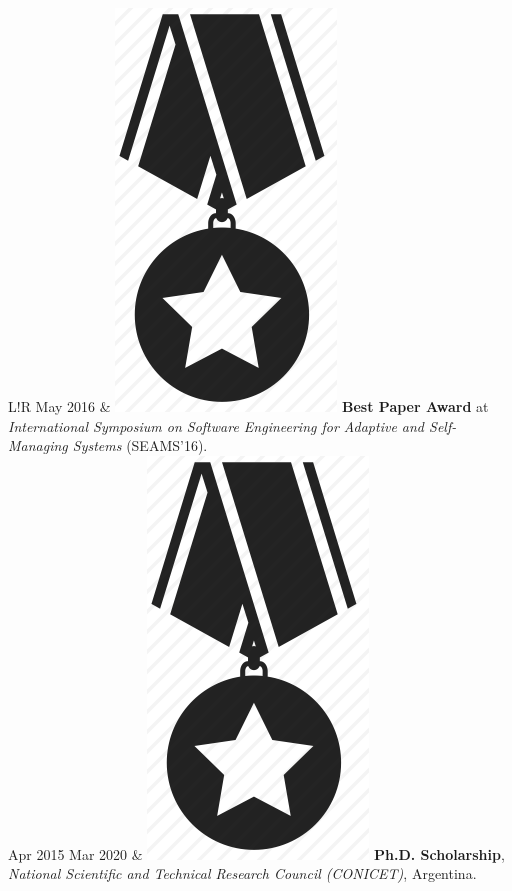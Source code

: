\documentclass[10pt]{article}
\newcommand\VRule{\color{lightgray}\vrule width 0.5pt}
\begin{document}
\begin{tabular}{L!{\VRule}R}
May 2016 & \includegraphics[scale=0.022]{../img/medal.png}
\textbf{Best Paper Award} at \textit{International Symposium on 
Software Engineering for Adaptive and Self-Managing Systems} (SEAMS'16).\\

Apr 2015 Mar 2020 & \includegraphics[scale=0.022]{../img/medal.png} 
\hspace{-0.85mm} 
\textbf{Ph.D. 
Scholarship}, \textit{National Scientific and Technical
Research Council (CONICET)}, Argentina.\\


\end{tabular}
\end{document}
